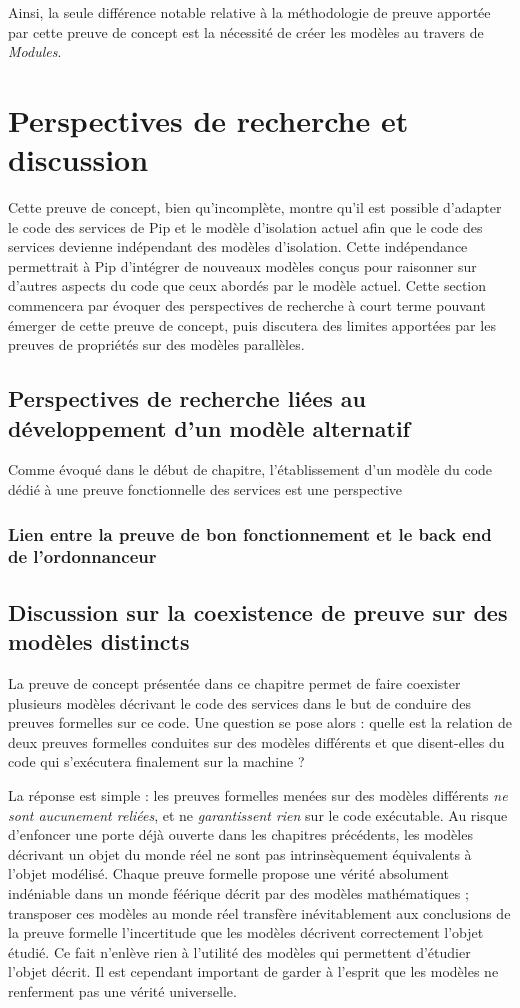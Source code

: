 		Ainsi, la seule différence notable relative à la méthodologie de preuve apportée par cette preuve de concept est la nécessité de créer les modèles au travers de \emph{Modules}.

	\section{Perspectives de recherche et discussion}
		Cette preuve de concept, bien qu'incomplète, montre qu'il est possible d'adapter le code des services de Pip et le modèle d'isolation actuel afin que le code des services devienne indépendant des modèles d'isolation. Cette indépendance permettrait à Pip d'intégrer de nouveaux modèles conçus pour raisonner sur d'autres aspects du code que ceux abordés par le modèle actuel. Cette section commencera par évoquer des perspectives de recherche à court terme pouvant émerger de cette preuve de concept, puis discutera des limites apportées par les preuves de propriétés sur des modèles parallèles.
		\subsection{Perspectives de recherche liées au développement d'un modèle alternatif}
		Comme évoqué dans le début de chapitre, l'établissement d'un modèle du code dédié à une preuve fonctionnelle des services est une perspective 
		\subsubsection{Lien entre la preuve de bon fonctionnement et le back end de l'ordonnanceur}
		\subsection{Discussion sur la coexistence de preuve sur des modèles distincts}

		La preuve de concept présentée dans ce chapitre permet de faire coexister plusieurs modèles décrivant le code des services dans le but de conduire des preuves formelles sur ce code. Une question se pose alors : quelle est la relation de deux preuves formelles conduites sur des modèles différents et que disent-elles du code qui s'exécutera finalement sur la machine ?

		La réponse est simple : les preuves formelles menées sur des modèles différents \emph{ne sont aucunement reliées}, et ne \emph{garantissent rien} sur le code exécutable. Au risque d'enfoncer une porte déjà ouverte dans les chapitres précédents, les modèles décrivant un objet du monde réel ne sont pas intrinsèquement équivalents à l'objet modélisé. Chaque preuve formelle propose une vérité absolument indéniable dans un monde féérique décrit par des modèles mathématiques ; transposer ces modèles au monde réel transfère inévitablement aux conclusions de la preuve formelle l'incertitude que les modèles décrivent correctement l'objet étudié. Ce fait n'enlève rien à l'utilité des modèles qui permettent d'étudier l'objet décrit. Il est cependant important de garder à l'esprit que les modèles ne renferment pas une vérité universelle.

